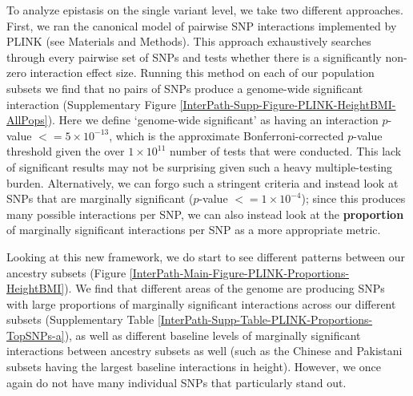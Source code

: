 \documentclass[12pt,a4paper]{article}
\begin{document}
To analyze epistasis on the single variant level, we take two different approaches. First, we ran the canonical model of pairwise SNP interactions implemented by PLINK (see Materials and Methods). This approach exhaustively searches through every pairwise set of SNPs and tests whether there is a significantly non-zero interaction effect size. Running this method on each of our population subsets we find that no pairs of SNPs produce a genome-wide significant interaction (Supplementary Figure \ref{InterPath-Supp-Figure-PLINK-HeightBMI-AllPops}). Here we define `genome-wide significant' as having an interaction $p$-value $<= 5\times10^{-13}$, which is the approximate Bonferroni-corrected $p$-value threshold given the over $1\times10^{11}$ number of tests that were conducted. This lack of significant results may not be surprising given such a heavy multiple-testing burden. Alternatively, we can forgo such a stringent criteria and instead look at SNPs that are marginally significant ($p$-value $<= 1\times10^{-4}$); since this produces many possible interactions per SNP, we can also instead look at the \textbf{proportion} of marginally significant interactions per SNP as a more appropriate metric.  

Looking at this new framework, we do start to see different patterns between our ancestry subsets (Figure \ref{InterPath-Main-Figure-PLINK-Proportions-HeightBMI}). We find that different areas of the genome are producing SNPs with large proportions of marginally significant interactions across our different subsets (Supplementary Table \ref{InterPath-Supp-Table-PLINK-Proportions-TopSNPs-a}), as well as different baseline levels of marginally significant interactions between ancestry subsets as well (such as the Chinese and Pakistani subsets having the largest baseline interactions in height). However, we once again do not have many individual SNPs that particularly stand out. 
\end{document}
